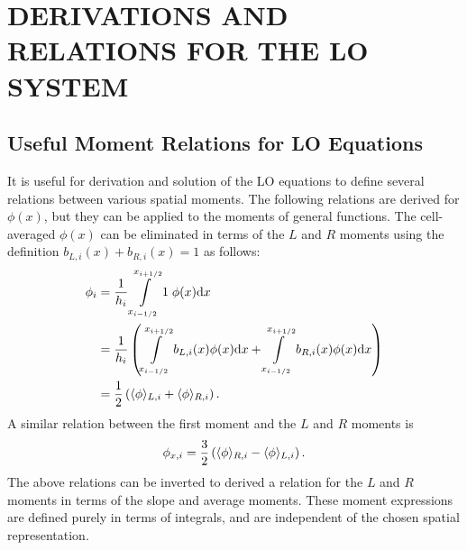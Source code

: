 %
%
%



\chapter{\uppercase{Derivations and Relations for the LO System}}

\section{Useful Moment Relations for LO Equations}
\label{app:lo_mom_relations}

It is useful for derivation and solution of the LO equations to define  several relations between various spatial moments. 
The following relations are derived for $\phi(x)$,
but they can be applied to the moments of general functions.  The cell-averaged $\phi(x)$ 
can be eliminated in terms of the $L$ and $R$ moments using the definition
$b_{L,i}(x)+b_{R,i}(x)=1$ as follows:
\begin{align}\label{app:atoL}
    \phi_{i} &= \frac{1}{h_i} \int\limits_{{x_{i-1/2}}}^{{x_{i+1/2}}} 1 \;\phi(x) \mathrm{d} x \\
             &= \frac{1}{h_i} \left(\int\limits_{{x_{i-1/2}}}^{{x_{i+1/2}}} b_{L,i}(x) \phi(x) \mathrm{d} x +
             \int\limits_{{x_{i-1/2}}}^{{x_{i+1/2}}} b_{R,i}(x) \phi(x) \mathrm{d} x \right)\\
             &= \frac{1}{2} \left( \langle \phi \rangle_{L,i} + \langle \phi \rangle_{R,i} \right).
\end{align}
A similar relation between the first moment and the $L$ and $R$ moments is
\begin{equation}
    {\phi}_{x,i} = \frac{3}{2} \left(\langle \phi \rangle_{R,i} - \langle \phi \rangle_{L,i}\right).
\end{equation}
The above relations can be inverted to derived a relation for the $L$ and $R$ moments in terms of the slope
and average moments.  These moment expressions are defined purely in terms of integrals,
and are independent of the chosen spatial representation.

